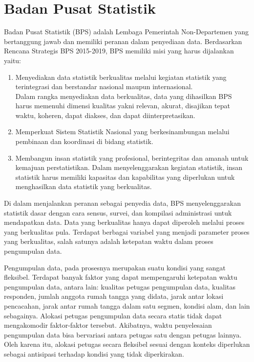 \section{Badan Pusat Statistik}
\label{sec:badan-pusat-statistik}
Badan Pusat Statistik (BPS) adalah Lembaga Pemerintah Non-Departemen yang bertanggung jawab dan memiliki peranan dalam penyediaan data. Berdasarkan Rencana Strategis BPS 2015-2019, BPS memiliki misi yang harus dijalankan yaitu:
\begin{enumerate}
\item Menyediakan data statistik berkualitas melalui kegiatan statistik yang terintegrasi dan berstandar nasional maupun internasional. \\
Dalam rangka menyediakan data berkualitas, data yang dihasilkan BPS harus memenuhi dimensi kualitas yakni relevan, akurat, disajikan tepat waktu, koheren, dapat diakses, dan dapat diinterpretasikan.
\item Memperkuat Sistem Statistik Nasional yang berkesinambungan melalui pembinaan dan koordinasi di bidang statistik.
\item Membangun insan statistik yang profesional, berintegritas dan amanah untuk kemajuan perstatistikan.
Dalam menyelenggarakan kegiatan statistik, insan statistik harus memiliki kapasitas dan kapabilitas yang diperlukan untuk menghasilkan data statistik yang berkualitas.
\end{enumerate}


Di dalam menjalankan peranan sebagai penyedia data, BPS menyelenggarakan statistik dasar dengan cara sensus, survei, dan kompilasi administrasi untuk mendapatkan data. Data yang berkualitas hanya dapat diperoleh melalui proses yang berkualitas pula. Terdapat berbagai variabel yang menjadi parameter proses yang berkualitas, salah satunya adalah ketepatan waktu dalam proses pengumpulan data.


Pengumpulan data, pada prosesnya merupakan suatu kondisi yang sangat fleksibel. Terdapat banyak faktor yang dapat mempengaruhi ketepatan waktu pengumpulan data, antara lain: kualitas petugas pengumpulan data, kualitas responden, jumlah anggota rumah tangga yang didata, jarak antar lokasi pencacahan, jarak antar rumah tangga dalam satu segmen, kondisi alam, dan lain sebagainya. Alokasi petugas pengumpulan data secara statis tidak dapat mengakomodir faktor-faktor tersebut. Akibatnya, waktu penyelesaian pengumpulan data bisa bervariasi antara petugas satu dengan petugas lainnya. Oleh karena itu, alokasi petugas secara fleksibel sesuai dengan konteks diperlukan sebagai antisipasi terhadap kondisi yang tidak diperkirakan.


